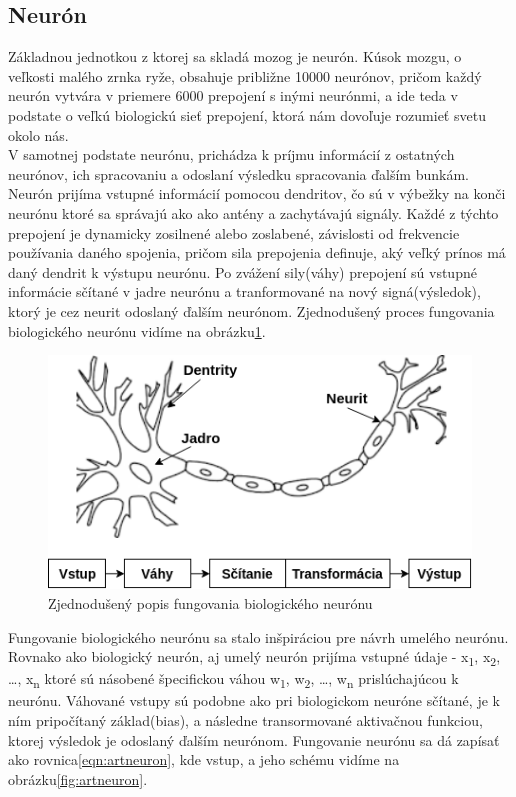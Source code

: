 \subsection{Neurón}
Základnou jednotkou z ktorej sa skladá mozog je neurón.
Kúsok mozgu, o veľkosti malého zrnka ryže, obsahuje približne 10000 neurónov, pričom každý neurón
vytvára v priemere 6000 prepojení s inými neurónmi, a ide teda v podstate o
veľkú biologickú sieť prepojení, ktorá nám dovoľuje rozumieť svetu okolo nás\cite{buduma2017fundamentals}. \\
\indent V samotnej podstate neurónu, prichádza k príjmu informácií z ostatných neurónov, 
ich spracovaniu a odoslaní výsledku spracovania ďalším bunkám.
Neurón prijíma vstupné informácií pomocou dendritov, čo sú v výbežky na konči neurónu ktoré sa správajú ako 
ako antény a zachytávajú signály.
Každé z týchto prepojení je dynamicky zosilnené alebo zoslabené, závislosti od frekvencie používania daného spojenia, pričom sila prepojenia definuje, aký veľký prínos má daný dendrit k výstupu neurónu\cite{buduma2017fundamentals}.
Po zvážení sily(váhy) prepojení sú vstupné informácie sčítané v jadre neurónu a tranformované na 
nový signá(výsledok), ktorý je cez neurit odoslaný ďalším neurónom.
Zjednodušený proces fungovania biologického neurónu vidíme na obrázku\ref{fig:bioneuron}.

\begin{figure}[H]
	\centering
	\includegraphics[width=0.5\linewidth]{img/bioneuron}
	\caption{Zjednodušený popis fungovania biologického neurónu}
	\label{fig:bioneuron}
\end{figure}

\indent Fungovanie biologického neurónu sa stalo inšpiráciou pre návrh umelého neurónu.
Rovnako ako biologický neurón, aj umelý neurón prijíma vstupné údaje - x\textsubscript{1},  x\textsubscript{2}, \dots,  x\textsubscript{n} ktoré sú násobené špecifickou váhou w\textsubscript{1},  w\textsubscript{2}, \dots,  w\textsubscript{n} prislúchajúcou k neurónu.
Váhované vstupy sú podobne ako pri biologickom neuróne sčítané, je k ním pripočítaný
základ(bias), a následne transormované aktivačnou funkciou, ktorej výsledok je odoslaný ďalším neurónom. Fungovanie neurónu sa dá zapísať ako rovnica\eqref{eqn:artneuron}, kde vstup, a jeho schému vidíme na obrázku\ref{fig:artneuron}.

